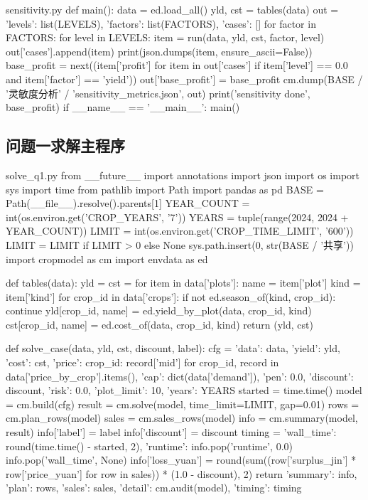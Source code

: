 \documentclass[bwprint]{gmcmthesis}
\begin{document}
\begin{appendices}
\begin{Python}{sensitivity.py}
def main():
    data = ed.load_all()
    yld, cst = tables(data)
    out = {'levels': list(LEVELS), 'factors': list(FACTORS), 'cases': []}
    for factor in FACTORS:
        for level in LEVELS:
            item = run(data, yld, cst, factor, level)
            out['cases'].append(item)
            print(json.dumps(item, ensure_ascii=False))
    base_profit = next((item['profit'] for item in out['cases'] if item['level'] == 0.0 and item['factor'] == 'yield'))
    out['base_profit'] = base_profit
    cm.dump(BASE / '灵敏度分析' / 'sensitivity_metrics.json', out)
    print('sensitivity done', base_profit)
if __name__ == '__main__':
    main()
\end{Python}

\subsection{问题一求解主程序}


\begin{Python}{solve\_q1.py}
from __future__ import annotations
import json
import os
import sys
import time
from pathlib import Path
import pandas as pd
BASE = Path(__file__).resolve().parents[1]
YEAR_COUNT = int(os.environ.get('CROP_YEARS', '7'))
YEARS = tuple(range(2024, 2024 + YEAR_COUNT))
LIMIT = int(os.environ.get('CROP_TIME_LIMIT', '600'))
LIMIT = LIMIT if LIMIT > 0 else None
sys.path.insert(0, str(BASE / '共享'))
import cropmodel as cm
import envdata as ed

def tables(data):
    yld = {}
    cst = {}
    for item in data['plots']:
        name = item['plot']
        kind = item['kind']
        for crop_id in data['crops']:
            if not ed.season_of(kind, crop_id):
                continue
            yld[crop_id, name] = ed.yield_by_plot(data, crop_id, kind)
            cst[crop_id, name] = ed.cost_of(data, crop_id, kind)
    return (yld, cst)

def solve_case(data, yld, cst, discount, label):
    cfg = {'data': data, 'yield': yld, 'cost': cst, 'price': {crop_id: record['mid'] for crop_id, record in data['price_by_crop'].items()}, 'cap': dict(data['demand']), 'pen': 0.0, 'discount': discount, 'risk': 0.0, 'plot_limit': 10, 'years': YEARS}
    started = time.time()
    model = cm.build(cfg)
    result = cm.solve(model, time_limit=LIMIT, gap=0.01)
    rows = cm.plan_rows(model)
    sales = cm.sales_rows(model)
    info = cm.summary(model, result)
    info['label'] = label
    info['discount'] = discount
    timing = {'wall_time': round(time.time() - started, 2), 'runtime': info.pop('runtime', 0.0)}
    info.pop('wall_time', None)
    info['loss_yuan'] = round(sum((row['surplus_jin'] * row['price_yuan'] for row in sales)) * (1.0 - discount), 2)
    return {'summary': info, 'plan': rows, 'sales': sales, 'detail': cm.audit(model), 'timing': timing}


\end{Python}
\end{appendices}
\end{document}
